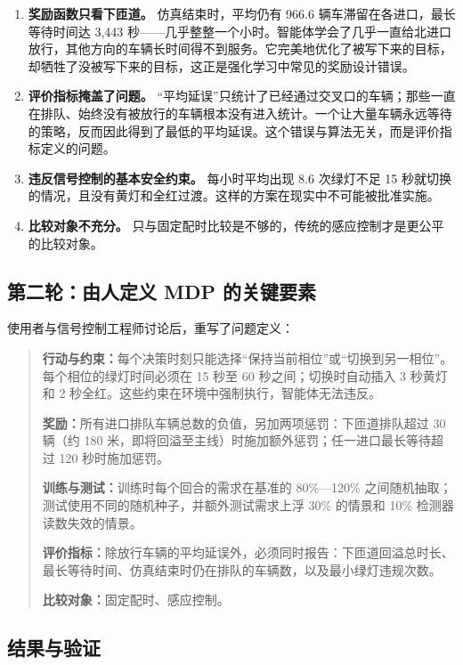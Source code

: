 \begin{enumerate}
  \item \textbf{奖励函数只看下匝道。} 仿真结束时，平均仍有 966.6 辆车滞留在各进口，最长等待时间达 3,443 秒——几乎整整一个小时。智能体学会了几乎一直给北进口放行，其他方向的车辆长时间得不到服务。它完美地优化了被写下来的目标，却牺牲了没被写下来的目标，这正是强化学习中常见的奖励设计错误\cite{amodei2016concrete}。
  \item \textbf{评价指标掩盖了问题。} “平均延误”只统计了已经通过交叉口的车辆；那些一直在排队、始终没有被放行的车辆根本没有进入统计。一个让大量车辆永远等待的策略，反而因此得到了最低的平均延误。这个错误与算法无关，而是评价指标定义的问题。
  \item \textbf{违反信号控制的基本安全约束。} 每小时平均出现 8.6 次绿灯不足 15 秒就切换的情况，且没有黄灯和全红过渡。这样的方案在现实中不可能被批准实施。
  \item \textbf{比较对象不充分。} 只与固定配时比较是不够的，传统的感应控制才是更公平的比较对象。
\end{enumerate}

\subsection{第二轮：由人定义 MDP 的关键要素}

使用者与信号控制工程师讨论后，重写了问题定义：

\begin{quote}
\textbf{行动与约束：}每个决策时刻只能选择“保持当前相位”或“切换到另一相位”。每个相位的绿灯时间必须在 15 秒至 60 秒之间；切换时自动插入 3 秒黄灯和 2 秒全红。这些约束在环境中强制执行，智能体无法违反。

\textbf{奖励：}所有进口排队车辆总数的负值，另加两项惩罚：下匝道排队超过 30 辆（约 180 米，即将回溢至主线）时施加额外惩罚；任一进口最长等待超过 120 秒时施加惩罚。

\textbf{训练与测试：}训练时每个回合的需求在基准的 80\%—120\% 之间随机抽取；测试使用不同的随机种子，并额外测试需求上浮 30\% 的情景和 10\% 检测器读数失效的情景。

\textbf{评价指标：}除放行车辆的平均延误外，必须同时报告：下匝道回溢总时长、最长等待时间、仿真结束时仍在排队的车辆数，以及最小绿灯违规次数。

\textbf{比较对象：}固定配时、感应控制。
\end{quote}

\subsection{结果与验证}

